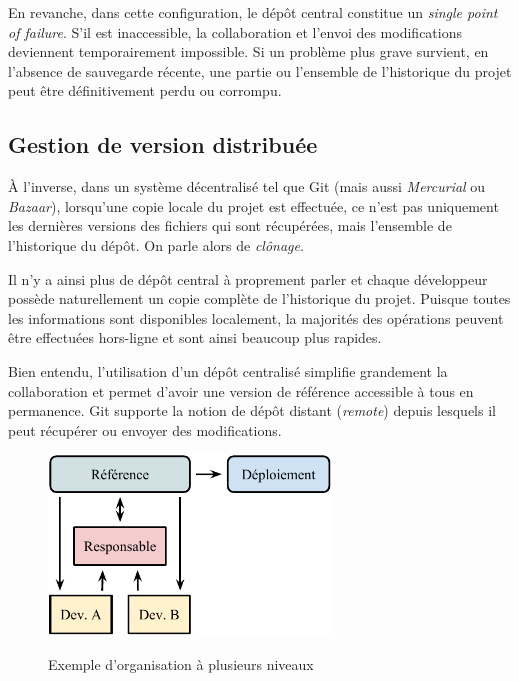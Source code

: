 \documentclass[11pt,a4paper]{article}
\begin{document}
En revanche, dans cette configuration, le dépôt central constitue un \textit{single point of failure}.
S'il est inaccessible, la collaboration et l'envoi des modifications deviennent temporairement impossible.
Si un problème plus grave survient, en l'absence de sauvegarde récente, une partie ou l'ensemble de l'historique du projet peut être définitivement perdu ou corrompu.

\subsection{Gestion de version distribuée}

À l'inverse, dans un système décentralisé tel que Git (mais aussi \textit{Mercurial} ou \textit{Bazaar}), lorsqu'une copie locale du projet est effectuée, ce n'est pas uniquement les dernières versions des fichiers qui sont récupérées, mais l'ensemble de l'historique du dépôt.
On parle alors de \textit{clônage}.

Il n'y a ainsi plus de dépôt central à proprement parler et chaque développeur possède naturellement un copie complète de l'historique du projet. Puisque toutes les informations sont disponibles localement, la majorités des opérations peuvent être effectuées hors-ligne et sont ainsi beaucoup plus rapides.


Bien entendu, l'utilisation d'un dépôt centralisé simplifie grandement la collaboration et permet d'avoir une version de référence accessible à tous en permanence.
Git supporte la notion de dépôt distant (\textit{remote}) depuis lesquels il peut récupérer ou envoyer des modifications.

\begin{figure}[H]
\begin{center}
\vspace{1em}
\includegraphics[width=7.5cm]{img_dvcs} \\
\caption{\small Exemple d'organisation à plusieurs niveaux}
\end{center}
\end{figure}
\end{document}
